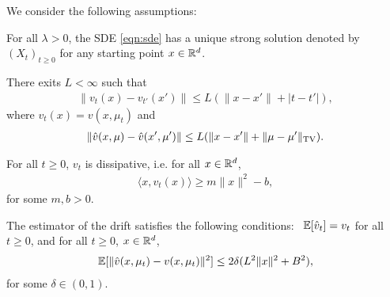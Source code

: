 We consider the following assumptions: \vspace{\minvsp pt}
\begin{assumption}
\label{asmp:sde_ergo}
For all $\lambda >0$, the SDE  \eqref{eqn:sde} has a unique strong solution denoted by $(X_t)_{t\geq 0}$ for any starting point $x \in \mathbb{R}^d$. %
\vspace{\minvsp pt}
\end{assumption}
%
%
\begin{assumption}
\label{asmp:lipschitz}
There exits $L < \infty$ such that
\begin{align}
\| v_t(x) - v_{t'}(x') \| \leq L ( \|x-x' \| + |t-t'|),
\end{align}
where $v_t(x) = v(x,\mu_t)$ and
\begin{align}
\| \hat{v}(x,\mu) - \hat{v}(x',\mu') \| \leq L ( \|x-x' \| + \|\mu-\mu'\|_{\textnormal{TV}}).
\end{align}
\vspace{\minvsp pt}
\end{assumption}
%
\begin{assumption}
\label{asmp:dissip}
For all $t \geq 0$, $v_t$ is dissipative, i.e. for all $x \in \mathbb{R}^d$,
\begin{align}
\langle x, v_t(x) \rangle \geq m \|x\|^2 -b,
\end{align}
for some $m,b >0$.
\vspace{\minvsp pt}
\end{assumption}
%
\begin{assumption}
\label{asmp:stochgrad}
The estimator of the drift satisfies the following conditions: \ $\mathbb{E}[\hat{v}_t] = v_t$ for all $t \geq 0$, and for all $t\geq 0$, $x \in \mathbb{R}^d$,
\begin{align}
\mathbb{E}[ \|\hat{v}(x,\mu_t) - v(x,\mu_t) \|^2] \leq 2 \delta(L^2 \|x\|^2 + B^2),
\end{align}
for some $\delta \in (0,1)$. %
\vspace{\minvsp pt}
\end{assumption}
